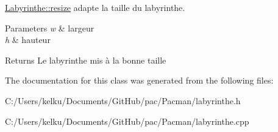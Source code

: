 \hyperlink{class_labyrinthe_a3775a7110debab5f9ac3e1e144b485b9}{Labyrinthe\+::resize} adapte la taille du labyrinthe. 


\begin{DoxyParams}{Parameters}
{\em w} & largeur \\
\hline
{\em h} & hauteur \\
\hline
\end{DoxyParams}
\begin{DoxyReturn}{Returns}
Le labyrinthe mis à la bonne taille 
\end{DoxyReturn}


The documentation for this class was generated from the following files\+:\begin{DoxyCompactItemize}
\item 
C\+:/\+Users/kelku/\+Documents/\+Git\+Hub/pac/\+Pacman/labyrinthe.\+h\item 
C\+:/\+Users/kelku/\+Documents/\+Git\+Hub/pac/\+Pacman/labyrinthe.\+cpp\end{DoxyCompactItemize}
